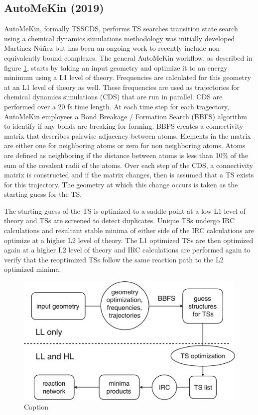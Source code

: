 \documentclass[preprint, 11pt]{elsarticle} %
\begin{document}
\subsection{AutoMeKin (2019)}

AutoMeKin, formally TSSCDS, performs TS searches transition state search using a chemical dynamics simulations methodology was initially developed Martínez-Núñez but has been an ongoing work to recently include non-equivalently bound complexes.
The general AutoMeKin workflow, as described in figure \ref{fig:tsscds}, starts by taking an input geometry and optimize it to an energy minimum using a L1 level of theory.
Frequencies are calculated for this geometry at an L1 level of theory as well.
These frequencies are used as trajectories for chemical dynamics simulations (CDS) that are run in parallel.
CDS are performed over a 20 fs time length.
At each time step for each tragectory, AutoMeKin employees a Bond Breakage / Formation Search (BBFS) algorithm to identify if any bonds are breaking for forming. 
BBFS creates a connectivity matrix that describes pairwise adjacency between atoms. 
Elements in the matrix are either one for neighboring atoms or zero for non neighboring atoms. 
Atoms are defined as neighboring if the distance between atoms is less than 10\% of the sum of the covalent radii of the atoms. 
Over each step of the CDS, a connectivity matrix is constructed and if the matrix changes, then is assumed that a TS exists for this trajectory.
The geometry at which this change occurs is taken as the starting guess for the TS.

The starting guess of the TS is optimized to a saddle point at a low L1 level of theory and TSs are screened to detect duplicates.
Unique TSs undergo IRC calculations and resultant stable minima of either side of the IRC calculations are optimize at a higher L2 level of theory. 
The L1 optimized TSs are then optimized again at a higher L2 level of theory and IRC calculations are performed again to verify that the reoptimized TSs follow the same reaction path to the L2 optimized minima. 
\begin{figure}
    \centering
    \includegraphics[width=5in]{tsscds}
    \caption{Caption}
    \label{fig:tsscds}
\end{figure}
\end{document}
